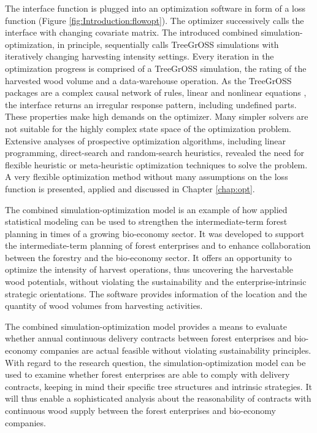 The interface function is plugged into an optimization software in form of a loss function (Figure \ref{fig:Introduction:flowopt}). The optimizer successively calls the interface with changing covariate matrix. The introduced combined si\-mu\-la\-tion-op\-ti\-mi\-za\-tion, in principle, sequentially calls TreeGrOSS simulations with iteratively changing harvesting intensity settings. Every iteration in the optimization progress is comprised of a TreeGrOSS simulation, the rating of the harvested wood volume and a data-warehouse operation. As the TreeGrOSS packages are a complex causal network of rules, linear and nonlinear equations \citep[p. 180]{hansen_2014}, the interface returns an irregular response pattern, including undefined parts. These properties make high demands on the optimizer. Many simpler solvers are not suitable for the highly complex state space of the optimization problem. Extensive analyses of prospective optimization algorithms, including linear programming, direct-search and random-search heuristics, revealed the need for flexible heuristic or meta-heuristic optimization techniques to solve the problem. A very flexible optimization method without many assumptions on the loss function is presented, applied and discussed in Chapter \ref{chap:opt}.

The combined simulation-optimization model is an example of how applied statistical modeling can be used to strengthen the intermediate-term forest planning in times of a growing bio-economy sector. It was developed to support the intermediate-term planning of forest enterprises and to enhance collaboration between the forestry and the bio-economy sector. It offers an opportunity to optimize the intensity of harvest operations, thus uncovering the harvestable wood potentials, without violating the sustainability and the enterprise-intrinsic strategic orientations. The software provides information of the location and the quantity of wood volumes from harvesting activities.

The combined si\-mu\-la\-tion-op\-ti\-mi\-za\-tion model provides a means to evaluate whether annual continuous delivery contracts between forest enterprises and bio-economy companies are actual feasible without violating sustainability principles. With regard to the research question, the si\-mu\-la\-tion-op\-ti\-mi\-za\-tion model can be used to examine whether forest enterprises are able to comply with delivery contracts, keeping in mind their specific tree structures and intrinsic strategies. It will thus enable a sophisticated analysis about the reasonability of contracts with continuous wood supply between the forest enterprises and bio-economy companies.

